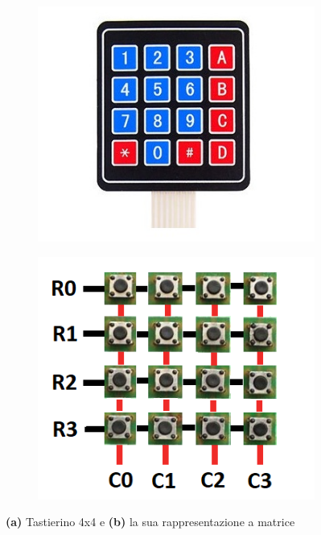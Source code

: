 \documentclass[12pt]{report}
\begin{document}
\begin{figure}[H]
	\centering
	\begin{subfigure}{.5\textwidth}
		\centering
		\includegraphics[width=0.6\linewidth]{./img/keypad.jpg}
		\caption{}
		\label{fig:keypad}
	\end{subfigure}%
	\begin{subfigure}{.5\textwidth}
		\centering
		\includegraphics[width=0.58\linewidth]{./img/keypad_matrix.png}
		\caption{}
		\label{fig:keypad_matrix}
	\end{subfigure}
	\caption{\textbf{(a)} Tastierino 4x4 e \textbf{(b)} la sua rappresentazione a matrice}
	\label{fig:keypad_both}
\end{figure}
\end{document}
